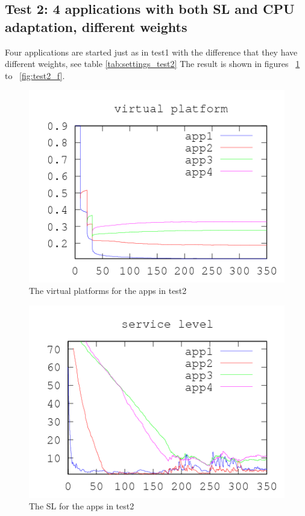 \documentclass[nobiblatex]{LTHthesis}
\begin{document}
\subsection{Test 2: 4 applications with both SL and CPU adaptation, different weights}

Four applications are started just as in test1 with the difference that they have different weights, see table \ref{tab:settings_test2}
The result is shown in figures ~\ref{fig:test2_vp} to ~\ref{fig:test2_f}. 
\begin{figure}[!H]
  \centering
  \includegraphics{"tools/plot/logs/test2/vp"}
  \caption{The virtual platforms for the apps in test2}
  \label{fig:test2_vp}
\end{figure}





\begin{figure}
  \centering
  \includegraphics{"tools/plot/logs/test2/sl"}
  \caption{The SL for the apps in test2}
  \label{fig:test2_sl}
\end{figure}
\end{document}
